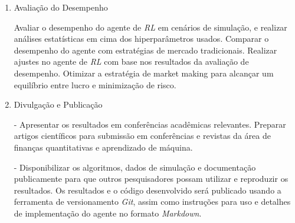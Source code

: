 \begin{enumerate}
\item Avaliação do Desempenho \label{item:evaluation}

Avaliar o desempenho do agente de \textit{RL} em cenários de simulação, e realizar análises estatísticas em cima dos hiperparâmetros usados. Comparar o desempenho do agente com estratégias de mercado tradicionais.
Realizar ajustes no agente de \textit{RL} com base nos resultados da avaliação de desempenho. Otimizar a estratégia de market making para alcançar um equilíbrio entre lucro e minimização de risco.

\item Divulgação e Publicação \label{item:publishing}

- Apresentar os resultados em conferências acadêmicas relevantes. Preparar artigos científicos para submissão em conferências e revistas da área de finanças quantitativas e aprendizado de máquina.

- Disponibilizar os algoritmos, dados de simulação e documentação publicamente para que outros pesquisadores possam utilizar e reproduzir os resultados. Os resultados e o código desenvolvido será publicado usando a ferramenta de versionamento \textit{Git}, assim como instruções para uso e detalhes de implementação do agente no formato \textit{Markdown}.
\end{enumerate}
